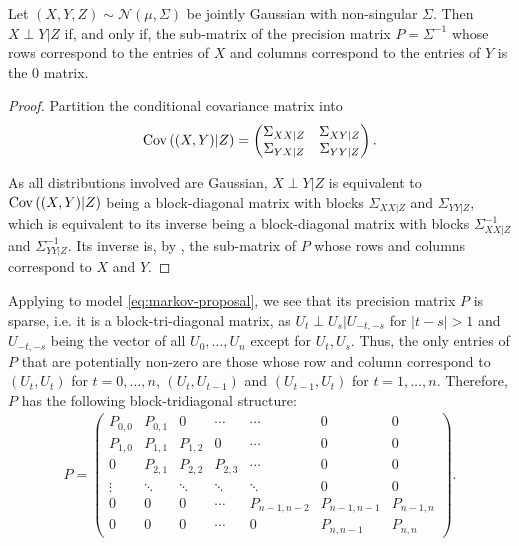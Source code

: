 \begin{lemma}
    \label{lem:gaussian_precision_zeros}
    Let $(X,Y,Z) \sim \mathcal N \left( \mu, \Sigma \right)$ be jointly Gaussian with non-singular $\Sigma$. Then $X \perp Y | Z$ if, and only if, the sub-matrix of the precision matrix $P = \Sigma^{-1}$ whose rows correspond to the entries of $X$ and columns correspond to the entries of $Y$ is the $0$ matrix.
\end{lemma}
\begin{proof}
    Partition the conditional covariance matrix into
    $$
    \operatorname{Cov} \left((X,Y) | Z\right) = \begin{pmatrix}
        \Sigma_{XX|Z} & \Sigma_{XY|Z} \\
        \Sigma_{YX|Z} & \Sigma_{YY|Z}
    \end{pmatrix}.
    $$

    As all distributions involved are Gaussian, $X \perp Y | Z$ is equivalent to $\operatorname{Cov} \left( (X,Y) |Z \right)$ being a block-diagonal matrix with blocks $\Sigma_{XX|Z}$ and $\Sigma_{YY|Z}$, which is equivalent to its inverse being a block-diagonal matrix with blocks $\Sigma_{XX|Z}^{-1}$ and $\Sigma_{YY|Z}^{-1}$. Its inverse is, by , the sub-matrix of $P$ whose rows and columns correspond to $X$ and $Y$. 
\end{proof}

Applying  to model \eqref{eq:markov-proposal}, we see that its precision matrix $P$ is sparse, i.e. it is a block-tri-diagonal matrix, as $U_{t} \perp U_{s} | U_{-t,-s}$ for $\lvert t - s\rvert > 1$ and $U_{-t,-s}$ being the vector of all $U_{0}, \dots, U_{n}$ except for $U_{t}, U_{s}$. Thus, the only entries of $P$ that are potentially non-zero are those whose row and column correspond to $(U_{t}, U_{t})$ for $t = 0, \dots, n$, $(U_{t}, U_{t - 1})$ and $(U_{t - 1}, U_{t})$ for $t=1, \dots, n$. 
Therefore, $P$ has the following block-tridiagonal structure:
\begin{align}
    \label{eq:P_structure}
P = \begin{pmatrix}
    P_{0,0} & P_{0, 1} & 0 & \cdots & \cdots & 0 & 0 \\
    P_{1, 0} & P_{1,1} & P_{1,2} & 0 & \cdots & 0 & 0\\
    0 & P_{2,1} & P_{2,2} & P_{2,3} & \cdots & 0 & 0 \\
    \vdots & \ddots & \ddots  & \ddots & \ddots & 0 & 0 \\
    0 & 0& 0& \cdots& P_{n - 1, n - 2}& P_{n - 1, n- 1} & P_{n - 1, n} \\
    0 & 0 & 0 & \cdots & 0 & P_{n, n - 1} & P_{n,n} 
\end{pmatrix}.
\end{align}

